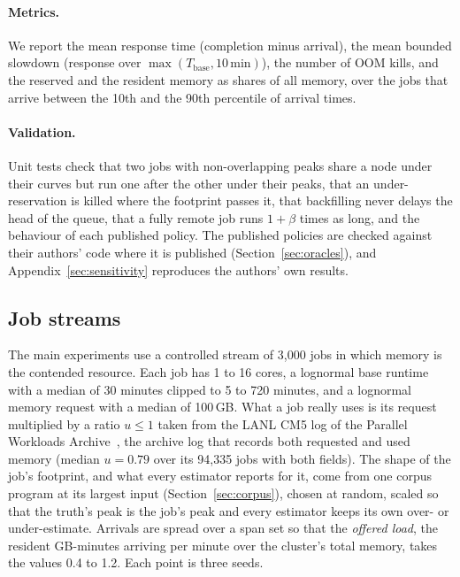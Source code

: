 \documentclass[11pt]{article}
\newcommand{\secref}[1]{Section~\ref{#1}}
\newcommand{\term}[1]{\emph{#1}}
\begin{document}
\paragraph{Metrics.} We report the mean response time (completion minus arrival), the mean bounded slowdown (response
over $\max(T_{\mathrm{base}}, 10\,\mathrm{min})$), the number of OOM kills, and the reserved and the resident memory as
shares of all memory, over the jobs that arrive between the 10th and the 90th percentile of arrival times.

\paragraph{Validation.} Unit tests check that two jobs with non-overlapping peaks share a node under their curves but run
one after the other under their peaks, that an under-reservation is killed where the footprint passes it, that
backfilling never delays the head of the queue, that a fully remote job runs $1 + \beta$ times as long, and the behaviour
of each published policy. The published policies are checked against their authors' code where it is published
(\secref{sec:oracles}), and Appendix~\ref{sec:sensitivity} reproduces the authors' own results.

\subsection{Job streams}
\label{sec:streams}

The main experiments use a controlled stream of 3{,}000 jobs in which memory is the contended resource. Each job has 1 to
16 cores, a lognormal base runtime with a median of 30 minutes clipped to 5 to 720 minutes, and a lognormal memory request
with a median of 100\,GB. What a job really uses is its request multiplied by a ratio $u \le 1$ taken from the LANL CM5
log of the Parallel Workloads Archive~\cite{PWA}, the archive log that records both requested and used memory (median
$u = 0.79$ over its 94{,}335 jobs with both fields). The shape of the job's footprint, and what every estimator reports
for it, come from one corpus program at its largest input (\secref{sec:corpus}), chosen at random, scaled so that the
truth's peak is the job's peak and every estimator keeps its own over- or under-estimate. Arrivals are spread over a span
set so that the \term{offered load}, the resident GB-minutes arriving per minute over the cluster's total memory, takes
the values 0.4 to 1.2. Each point is three seeds.
\end{document}
